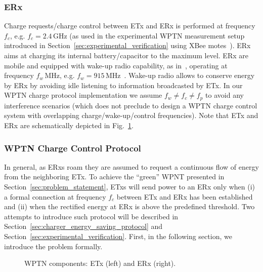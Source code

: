 \documentclass[11pt,draftclsnofoot,journal,onecolumn]{IEEEtran}
\begin{document}
\subsubsection{ERx}
\label{sec:erx}

Charge requests/charge control between ETx and ERx is performed at frequency $f_c$, e.g. $f_c=2.4$\,GHz (as used in the experimental WPTN measurement setup introduced in Section~\ref{sec:experimental_verification} using XBee motes~\cite{xbee_website}). ERx aims at charging its internal battery/capacitor to the maximum level. ERx are mobile and equipped with wake-up radio capability, as in~\cite[Sec. II]{holleman_biocas_2008}, operating at frequency $f_w$\,MHz, e.g. $f_w=915$\,MHz~\cite{wisp_website}. Wake-up radio allows to conserve energy by ERx by avoiding idle listening to information broadcasted by ETx. In our WPTN charge protocol implementation we assume $f_w\neq f_c\neq f_p$ to avoid any interference scenarios (which does not preclude to design a WPTN charge control system with overlapping charge/wake-up/control frequencies). Note that ETx and ERx are schematically depicted in Fig.~\ref{fig:wptn_hardware_model}.

\subsubsection{WPTN Charge Control Protocol}
\label{sec:charge_request_protocol}

In general, as ERxs roam they are assumed to request a continuous flow of energy from the neighboring ETx. To achieve the ``green'' WPNT presented in Section~\ref{sec:problem_statement}, ETxs will send power to an ERx only when (i) a formal connection at frequency $f_c$ between ETx and ERx has been established and (ii) when the rectified energy at ERx is above the predefined threshold. Two attempts to introduce such protocol will be described in Section~\ref{sec:charger_energy_saving_protocol} and Section~\ref{sec:experimental_verification}. First, in the following section, we introduce the problem formally.

\begin{figure}
\centering
{}
\caption{WPTN components: ETx (left) and ERx (right).}
\label{fig:wptn_hardware_model}
\end{figure}
\end{document}
